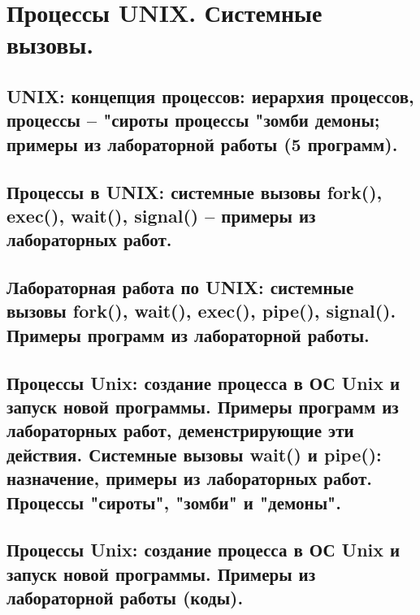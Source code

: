 \section{Процессы UNIX. Системные вызовы.}

\subsection{UNIX: концепция процессов: иерархия процессов, процессы – "сироты процессы "зомби демоны; примеры из лабораторной работы (5 программ).}

\newpage

\subsection{Процессы в UNIX: системные вызовы fork(), exec(), wait(), signal() – примеры из лабораторных работ.}

\newpage

\subsection{Лабораторная работа по UNIX: системные вызовы fork(), wait(), exec(), pipe(), signal(). Примеры программ из лабораторной работы.}

\newpage

\subsection{Процессы Unix: создание процесса в ОС Unix и запуск новой программы. Примеры программ из лабораторных работ, деменстрирующие эти действия. Системные вызовы wait() и pipe(): назначение, примеры из лабораторных работ. Процессы "сироты", "зомби" и "демоны".}

\newpage

\subsection{Процессы Unix: создание процесса в ОС Unix и запуск новой программы. Примеры из лабораторной работы (коды).}
